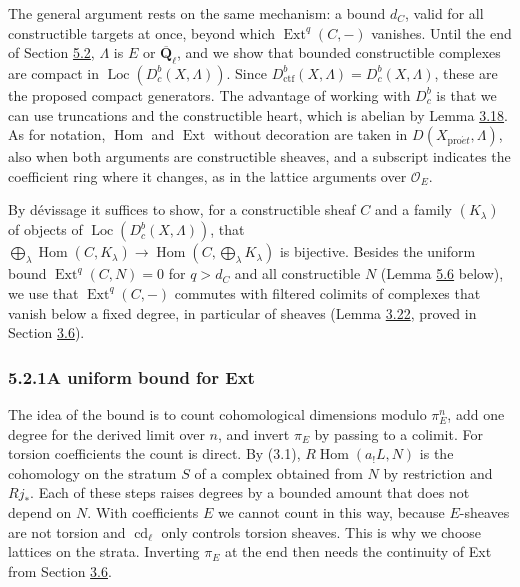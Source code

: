 \documentclass[11pt]{article}
\providecommand{\Dbc}{}\renewcommand{\Dbc}{D^b_c}
\providecommand{\Ext}{}\renewcommand{\Ext}{\operatorname{Ext}}
\providecommand{\Hom}{}\renewcommand{\Hom}{\operatorname{Hom}}
\providecommand{\Loc}{}\renewcommand{\Loc}{\operatorname{Loc}}
\begin{document}
\label{bp418}%
The general argument rests on the same mechanism: a bound \(d_C\), valid for all constructible targets at once, beyond which \(\Ext^q(C,-)\) vanishes. Until the end of Section \hyperref[bp415]{5.2}, \(\Lambda\) is \(E\) or \(\overline{\mathbf Q}_\ell\), and we show that bounded constructible complexes are compact in \(\Loc(\Dbc(X,\Lambda))\). Since \(D^b_{\mathrm{ctf}}(X,\Lambda)=\Dbc(X,\Lambda)\), these are the proposed compact generators. The advantage of working with \(\Dbc\) is that we can use truncations and the constructible heart, which is abelian by Lemma \hyperref[bp248]{3.18}. As for notation, \(\Hom\) and \(\Ext\) without decoration are taken in \(D(X_{\mathrm{pro}\acute{e}t},\Lambda)\), also when both arguments are constructible sheaves, and a subscript indicates the coefficient ring where it changes, as in the lattice arguments over \(\mathcal O_E\).

By dévissage it suffices to show, for a constructible sheaf \(C\) and a family \((K_\lambda)\) of objects of \(\Loc(\Dbc(X,\Lambda))\), that \(\bigoplus_\lambda\Hom(C,K_\lambda)\to\Hom(C,\bigoplus_\lambda K_\lambda)\) is bijective. Besides the uniform bound \(\Ext^q(C,N)=0\) for \(q>d_C\) and all constructible \(N\) (Lemma \hyperref[bp426]{5.6} below), we use that \(\Ext^q(C,-)\) commutes with filtered colimits of complexes that vanish below a fixed degree, in particular of sheaves (Lemma \hyperref[bp260]{3.22}, proved in Section \hyperref[bp255]{3.6}).

\subsubsection*{\texorpdfstring{5.2.1\quad A uniform bound for Ext}{5.2.1 A uniform bound for Ext}}
\label{bp419}%
\label{bp420}%
The idea of the bound is to count cohomological dimensions modulo \(\pi_E^n\), add one degree for the derived limit over \(n\), and invert \(\pi_E\) by passing to a colimit. For torsion coefficients the count is direct. By (3.1), \(R\!\operatorname{Hom}(a_!L,N)\) is the cohomology on the stratum \(S\) of a complex obtained from \(N\) by restriction and \(Rj_*\). Each of these steps raises degrees by a bounded amount that does not depend on \(N\). With coefficients \(E\) we cannot count in this way, because \(E\)-sheaves are not torsion and \(\operatorname{cd}_\ell\) only controls torsion sheaves. This is why we choose lattices on the strata. Inverting \(\pi_E\) at the end then needs the continuity of Ext from Section \hyperref[bp255]{3.6}.
\end{document}
